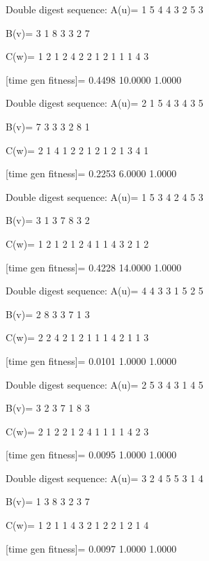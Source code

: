 Double digest sequence:
A(u)=
     1     5     4     4     3     2     5     3

B(v)=
     3     1     8     3     3     2     7

C(w)=
     1     2     1     2     4     2     2     1     2     1     1     1     4     3

[time gen fitness]=
    0.4498   10.0000    1.0000

Double digest sequence:
A(u)=
     2     1     5     4     3     4     3     5

B(v)=
     7     3     3     3     2     8     1

C(w)=
     2     1     4     1     2     2     1     2     1     2     1     3     4     1

[time gen fitness]=
    0.2253    6.0000    1.0000

Double digest sequence:
A(u)=
     1     5     3     4     2     4     5     3

B(v)=
     3     1     3     7     8     3     2

C(w)=
     1     2     1     2     1     2     4     1     1     4     3     2     1     2

[time gen fitness]=
    0.4228   14.0000    1.0000

Double digest sequence:
A(u)=
     4     4     3     3     1     5     2     5

B(v)=
     2     8     3     3     7     1     3

C(w)=
     2     2     4     2     1     2     1     1     1     4     2     1     1     3

[time gen fitness]=
    0.0101    1.0000    1.0000

Double digest sequence:
A(u)=
     2     5     3     4     3     1     4     5

B(v)=
     3     2     3     7     1     8     3

C(w)=
     2     1     2     2     1     2     4     1     1     1     1     4     2     3

[time gen fitness]=
    0.0095    1.0000    1.0000

Double digest sequence:
A(u)=
     3     2     4     5     5     3     1     4

B(v)=
     1     3     8     3     2     3     7

C(w)=
     1     2     1     1     4     3     2     1     2     2     1     2     1     4

[time gen fitness]=
    0.0097    1.0000    1.0000

